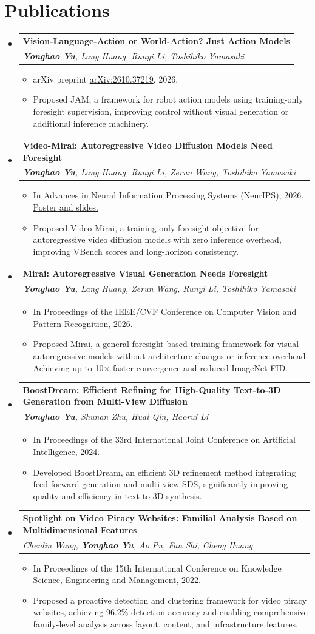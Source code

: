 \documentclass[letterpaper,11pt]{article}
\newcommand{\resumeItem}[1]{
  \item\small{
    {#1 \vspace{-2pt}}
  }
}
\newcommand{\resumePaper}[2]{
    \item
    \begin{tabular*}{0.97\textwidth}{>{\raggedright\arraybackslash}p{0.97\textwidth}}
      \textbf{#1} \\
      \textit{\small #2} \\
    \end{tabular*}\vspace{-7pt}
}
\newcommand{\resumeSubHeadingListStart}{\begin{itemize}[leftmargin=0.15in, label={}]}
\newcommand{\resumeSubHeadingListEnd}{\end{itemize}}
\newcommand{\resumeItemListStart}{\begin{itemize}}
\newcommand{\resumeItemListEnd}{\end{itemize}\vspace{-5pt}}
\begin{document}
\section{Publications}
  \resumeSubHeadingListStart
    \resumePaper
      {Vision-Language-Action or World-Action? Just Action Models}
      {\textbf{Yonghao Yu}, Lang Huang, Runyi Li, Toshihiko Yamasaki}
      \resumeItemListStart
        \resumeItem{arXiv preprint \href{https://arxiv.org/abs/2610.37219}{arXiv:2610.37219}, 2026.}
        \resumeItem{Proposed JAM, a framework for robot action models using training-only foresight supervision, improving control without visual generation or additional inference machinery.}
      \resumeItemListEnd
    \resumePaper
      {Video-Mirai: Autoregressive Video Diffusion Models Need Foresight}
      {\textbf{Yonghao Yu}, Lang Huang, Runyi Li, Zerun Wang, Toshihiko Yamasaki}
      \resumeItemListStart
        \resumeItem{In Advances in Neural Information Processing Systems (NeurIPS), 2026. \href{https://neurips.cc/virtual/2026/loc/sydney/poster/156098}{Poster and slides.}}
        \resumeItem{Proposed Video-Mirai, a training-only foresight objective for autoregressive video diffusion models with zero inference overhead, improving VBench scores and long-horizon consistency.}
      \resumeItemListEnd
    \resumePaper
      {Mirai: Autoregressive Visual Generation Needs Foresight}
      {\textbf{Yonghao Yu}, Lang Huang, Zerun Wang, Runyi Li, Toshihiko Yamasaki}
      \resumeItemListStart
        \resumeItem{In Proceedings of the IEEE/CVF Conference on Computer Vision and Pattern Recognition, 2026.}
        \resumeItem{Proposed Mirai, a general foresight-based training framework for visual autoregressive models without architecture changes or inference overhead. Achieving up to 10$\times$ faster convergence and reduced ImageNet FID.}
      \resumeItemListEnd
    \resumePaper
      {BoostDream: Efficient Refining for High-Quality Text-to-3D Generation from Multi-View Diffusion}
      {\textbf{Yonghao Yu}, Shunan Zhu, Huai Qin, Haorui Li}
      \resumeItemListStart
        \resumeItem{In Proceedings of the 33rd International Joint Conference on Artificial Intelligence, 2024.}
        \resumeItem{Developed BoostDream, an efficient 3D refinement method integrating feed-forward generation and multi-view SDS, significantly improving quality and efficiency in text-to-3D synthesis.}
      \resumeItemListEnd
    \resumePaper
      {Spotlight on Video Piracy Websites: Familial Analysis Based on Multidimensional Features}
      {Chenlin Wang, \textbf{Yonghao Yu}, Ao Pu, Fan Shi, Cheng Huang}
      \resumeItemListStart
        \resumeItem{In Proceedings of the 15th International Conference on Knowledge Science, Engineering and Management, 2022.}
        \resumeItem{Proposed a proactive detection and clustering framework for video piracy websites, achieving 96.2\% detection accuracy and enabling comprehensive family-level analysis across layout, content, and infrastructure features.}
      \resumeItemListEnd
  \resumeSubHeadingListEnd
\end{document}

